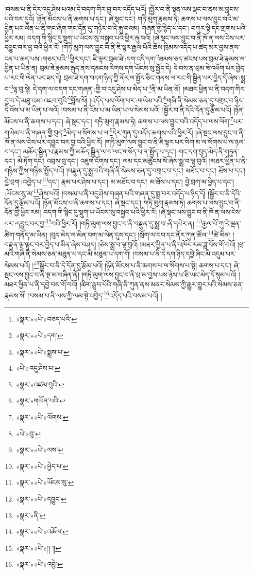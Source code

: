 །བསམ་པ་ནི་དེར་འདུ་ཤེས་པའམ་དེ་བདག་གིར་བྱ་བར་འདོད་པའོ། །སྦྱོར་བ་ནི་སྟན་ལས་ལྡང་བ་ནས་མ་བླངས་པའི་བར་དུའོ། །ཉོན་མོངས་པ་ནི་ཆགས་པ་དང་། ཞེ་སྡང་དང་། གཏི་མུག་རྣམས་ཏེ། ཆགས་པ་ལས་བྱུང་བའི་མ་བྱིན་པར་ལེན་པ་ནི་གང་ཞིག་གང་དོན་དུ་གཉེར་བ་དེ་རྐུ་བའམ། གཞན་གྱི་རྙེད་པ་དང་། བཀུར་སྟི་དང་གྲགས་པའི་ཕྱིར་རམ། བདག་གི་སྙིང་དུ་སྡུག་པ་ཡོངས་སུ་བསྐྱབ་པའི་ཕྱིར་རྐུ་བའོ། །ཞེ་སྡང་ལས་བྱུང་བ་ནི་ཁོ་ན་ལས་ངེས་པར་དབྱུང་བར་བྱ་བའི་ཕྱིར་རོ། །གཏི་མུག་ལས་བྱུང་བ་ནི་ཇི་ལྟར་རྒྱལ་པོའི་ཆོས་ཁྲིམས་འདོད་པ་ཚད་མར་བྱས་ནས་ངན་པ་ཆད་པས་:གཅད་པའི་\footnote{«སྣར་»«པེ་»བཅད་པའི་}ཕྱིར་དང་། ཇི་ལྟར་བྲམ་ཟེ་:དག་འདི་དག་\footnote{«སྣར་»«པེ་»དག་}ཐམས་ཅད་ཚངས་པས་བྲམ་ཟེ་རྣམས་ལ་བྱིན་པ་ཡིན་ན། བྲམ་ཟེ་རྣམས་རྒུད་ནས་དམངས་རིགས་དག་ཡོངས་སུ་སྤྱོད་དེ། དེ་བས་ན་བྲམ་ཟེ་འཕོག་པར་བྱེད་པ་རང་གི་ལེན་པར་ཟད་དེ། བྲམ་ཟེ་དག་བདག་ཉིད་ཀྱི་ནོར་ལ་སྤྱོད་ཅིང་གནས་ལ་རང་གི་སྦྱིན་པར་བྱེད་དོ་ཞེས་:སྨྲ་བ་\footnote{«སྣར་»«པེ་»སྨྲས་པ་}ལྟ་བུ་སྟེ། དེ་དག་ལ་བདག་དང་གཞན་:གྱི་བ་འདུ་ཤེས་པ་མེད་པ་\footnote{«པེ་»འདུ་ཤེས་པ་}ནི་མ་ཡིན་ནོ། །མཐར་ཕྱིན་པ་ནི་བདག་གིར་བྱ་བ་དེ་མཐུ་འམ་:འཇབ་བུའི་\footnote{«སྣར་»འཛམ་བུའི་}བློས་སོ། །འདོད་པས་ལོག་པར་:གཡེམ་པའི་\footnote{«སྣར་»གཡོན་པའི་}གཞི་ནི་སེམས་ཅན་དུ་བགྲང་བ་ཉིད་དེ་འོས་པ་མ་ཡིན་པ་ལའོ། །བསམ་པ་ནི་འོས་པ་མ་ཡིན་པ་ལ་སེམས་པའོ། །སྦྱོར་བ་ནི་དེའི་དོན་དུ་རྩོམ་པའོ། །ཉོན་མོངས་པ་ནི་ཆགས་པ་དང་། ཞེ་སྡང་དང་། གཏི་མུག་རྣམས་ཏེ། ཆགས་པ་ལས་བྱུང་བའི་འདོད་པ་ལས་ལོག་\footnote{«སྣར་»«པེ་»ལོགས་}པར་གཡེམ་པ་ནི་གཞན་གྱི་བུད་\footnote{«པེ་»བུ་}མེད་ལ་སོགས་པ་ལ་\footnote{«སྣར་»«པེ་»ལས་}དེར་ཀུན་དུ་འདོད་ཆགས་པའི་ཕྱིར་རོ། །ཞེ་སྡང་ལས་བྱུང་བ་ནི་ཁོ་ན་ལས་ངེས་པར་དབྱུང་བར་བྱ་བའི་ཕྱིར་རོ། །གཏི་མུག་ལས་བྱུང་བ་ནི་ཇི་ལྟར་པར་སིག་མ་ལ་སོགས་པ་ལ་ཉལ་བ་དང་། མཆོད་སྦྱིན་པ་རྣམས་ཀྱི་མཆོད་སྦྱིན་ལ་བ་ལང་གསོད་པ་ན་སྤྱོད་པ་དང་། གང་དག་བུད་མེད་ནི་གཏུན་དང་། མེ་ཏོག་དང་། འབྲས་བུ་དང་། འཇུག་ངོགས་དང་། ལམ་དང་མཚུངས་སོ་ཞེས་སྨྲ་བ་ལྟ་བུའོ། །མཐར་ཕྱིན་པ་ནི་གཉིས་ཀྱིས་གཉིས་སྤྲོད་པའོ། །བརྫུན་དུ་སྨྲ་བའི་གཞི་ནི་སེམས་ཅན་དུ་བགྲང་བ་དང་། མཐོང་བ་དང་། ཐོས་པ་དང་། བྱེ་བྲག་:འབྱེད་པ་\footnote{«སྣར་»«པེ་»ཕྱེད་པ་}དང་། རྣམ་པར་ཤེས་པ་དང་། མ་མཐོང་བ་དང་། མ་ཐོས་པ་དང་། བྱེ་བྲག་མ་ཕྱེད་པ་དང་། :ཡོངས་སུ་མ་\footnote{«སྣར་»«པེ་»ཡོངས་སུ་}ཤེས་པའོ། །བསམ་པ་ནི་འདུ་ཤེས་གཞན་པའི་གཞན་དུ་སྨྲ་བར་འདོད་པ་ཉིད་དོ། །སྦྱོར་བ་ནི་དེའི་དོན་དུ་རྩོམ་པའོ། །ཉོན་མོངས་པ་ནི་ཆགས་པ་དང་། ཞེ་སྡང་དང་། གཏི་མུག་རྣམས་ཏེ། ཆགས་པ་ལས་བྱུང་བ་ནི་དོན་གྱི་ཕྱིར་རམ། བདག་གི་སྙིང་དུ་སྡུག་པ་ཡོངས་སུ་བསྐྱབ་པའི་ཕྱིར་རོ། །ཞེ་སྡང་ལས་བྱུང་བ་ནི་ཁོ་ན་ལས་ངེས་པར་:དབྱུང་བར་བྱ་\footnote{«སྣར་»«པེ་»དབྱུང་}བའི་ཕྱིར་རོ། །གཏི་མུག་ལས་བྱུང་བ་ནི་བརྫུན་དུ་སྨྲ་བ་:ནི་དཔེར་ན། \footnote{«སྣར་»ནི་}རྒྱལ་པོ་ཀུ་རེ་ལྡན་ཚིག་གནོད་མ་ཡིན། །བུད་མེད་ལ་མིན་བག་མ་ལེན་དུས་དང་། །སྲོག་ལ་བབ་དང་ནོར་ཀུན་ཚོལ་\footnote{«སྣར་»«པེ་»འཆོལ་}ཚེ་མིན། །བརྫུན་ལྔ་ལྟུང་བར་བྱེད་པ་མིན་ཞེས་བཤད། །ཅེས་སྨྲ་བ་ལྟ་བུའོ། །མཐར་ཕྱིན་པ་ནི་འཁོར་རམ་ཟླ་བོས་གོ་བའོ། །ཕྲ་མའི་གཞི་ནི་སེམས་ཅན་མཐུན་པ་དང་མི་མཐུན་པ་དག་གོ། །བསམ་པ་ནི་དེ་དག་ཉིད་དབྱེ་ཞིང་མི་འདུམ་པར་སེམས་པའོ། །\footnote{«སྣར་»«པེ་»།། །།}སྦྱོར་བ་ནི་དེ་དོན་དུ་རྩོམ་པའོ། །ཉོན་མོངས་པ་ནི་ཆགས་པ་ལ་སོགས་པ་སྟེ། ཆགས་པ་དང་། ཞེ་སྡང་ལས་བྱུང་བ་ནི་སྔ་མ་བཞིན་ནོ། །གཏི་མུག་ལས་བྱུང་བ་ནི་ཕྲ་མ་བྱས་པས་ཉེས་པ་ཅི་ཡང་མེད་དོ་སྙམ་པའོ། །མཐར་ཕྱིན་པ་ནི་དབྱེ་བས་གོ་བའོ། །ཚིག་རྩུབ་པོའི་གཞི་ནི་ཀུན་ནས་མནར་སེམས་ཀྱི་རྒྱུར་གྱུར་པའི་སེམས་ཅན་རྣམས་སོ། །བསམ་པ་ནི་ལས་ཀྱི་ལམ་སྟེ་འབྱེད་\footnote{«སྣར་»«པེ་»འབྱེ་}འདོད་པའི་བསམ་པའོ། །
